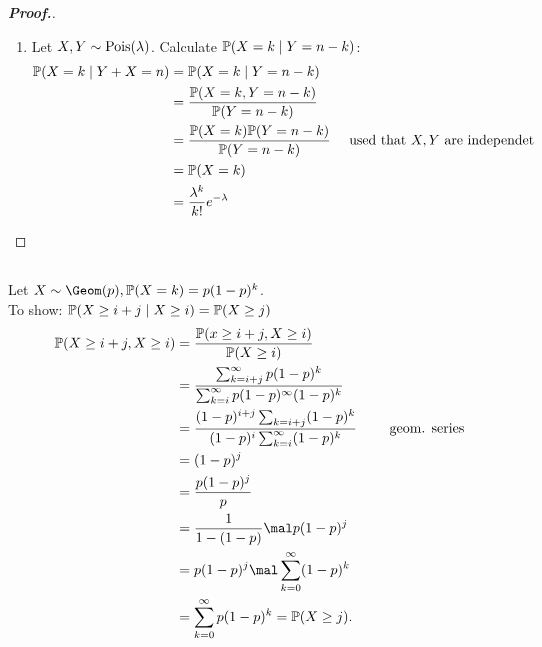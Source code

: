 \begin{proof}[\textbf{Proof.}]
\begin{enumerate}
\begin{proof}[\textbf{Proof.}]
\begin{align*}
				P_j := \set{P \subseteq N \bigcupdot M: \abs{P} = k \and \abs{P \cap N} = j\;(\and \abs{P\cap M} = k-j)},
			\end{align*}
			There are $\binom{n}{j}$ many $j$-elementary subsets of $N$ and $\binom{m}{k-j}$ many $(k-j)$-elementary subsets of $M$. For die cardinality of $P_j$ holds, that $\abs{P_j} = \binom{n}{j} \mal \binom{m}{k-j}$. And the sets $P_0, P_1, \dots, P_k$ pairwise disjoint. With the help of the sum rule follows
			\begin{align*}
				\binom{n+m}{k} = \sum_{j=0}^k \abs{P_j} = \sum_{j=0}^k \binom{n}{j} \mal \binom{m}{k-j}.
			\end{align*}
		\end{proof}
		\item Let $X,Y \sim \operatorname{Pois}(\lambda)$. Calculate $\mathbb{P}(X=k \mid Y = n -k)$:
		\begin{align*}
			\mathbb{P}(X = k \mid Y + X=n) &= \mathbb{P}(X=k \mid Y=n-k)\\
			&= \frac{\mathbb{P}(X=k, Y = n-k)}{\mathbb{P}(Y = n - k)}\\
			&= \frac{\mathbb{P}(X=k)\mathbb{P}(Y = n-k)}{\mathbb{P}(Y=n-k)} \quad \text{ used that $X,Y$ are independet}\\
			&= \mathbb{P}(X=k)\\
			&= \frac{\lambda^k}{k!} e^{-\lambda}
		\end{align*}
	\end{enumerate}
\end{proof}

\subsection{}
\begin{solution}
	Let $X \sim \Geom(p), \meas(X=k) = p(1-p)^k$.\\
	To show: $\mathbb{P}(X \ge i+j \mid X \ge i) = \mathbb{P}(X \ge j)$
	\begin{align*}
		\meas(X \ge i+j, X\ge i) &= \frac{\meas(x \ge i+j, X \ge i)}{\meas(X \ge i)}\\
		&= \frac{\sum_{k=i+j}^{\infty} p(1-p)^k}{\sum_{k=i}^{\infty} p(1-p)^{\infty} (1-p)^k}\\
		&= \frac{(1-p)^{i+j} \sum_{k=i+j}(1-p)^k}{(1-p)^i \sum_{k=i}^{\infty} (1-p)^k} \qquad \text{ geom. series}\\
		&= (1-p)^j\\
		&= \frac{p(1-p)^j}{p}\\
		&= \frac{1}{1-(1-p)}\mal p(1-p)^j\\
		&= p(1-p)^j \mal \sum_{k=0}^{\infty} (1-p)^k\\
		&= \sum_{k=0}^{\infty} p(1-p)^k = \meas(X \ge j).
	\end{align*}
\end{solution}
